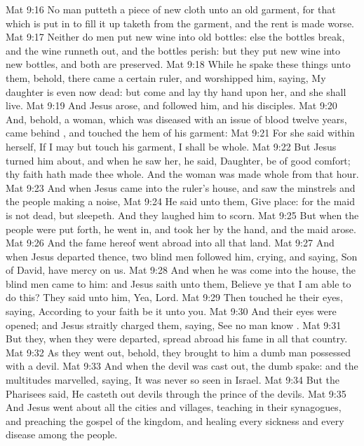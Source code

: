 \vs Mat 9:16 No man putteth a piece of new cloth unto an old garment, for that which is put in to fill it up taketh from the garment, and the rent is made worse.
\vs Mat 9:17 Neither do men put new wine into old bottles: else the bottles break, and the wine runneth out, and the bottles perish: but they put new wine into new bottles, and both are preserved.
\vs Mat 9:18 While he spake these things unto them, behold, there came a certain ruler, and worshipped him, saying, My daughter is even now dead: but come and lay thy hand upon her, and she shall live.
\vs Mat 9:19 And Jesus arose, and followed him, and  his disciples.
\vs Mat 9:20 And, behold, a woman, which was diseased with an issue of blood twelve years, came behind , and touched the hem of his garment:
\vs Mat 9:21 For she said within herself, If I may but touch his garment, I shall be whole.
\vs Mat 9:22 But Jesus turned him about, and when he saw her, he said, Daughter, be of good comfort; thy faith hath made thee whole. And the woman was made whole from that hour.
\vs Mat 9:23 And when Jesus came into the ruler's house, and saw the minstrels and the people making a noise,
\vs Mat 9:24 He said unto them, Give place: for the maid is not dead, but sleepeth. And they laughed him to scorn.
\vs Mat 9:25 But when the people were put forth, he went in, and took her by the hand, and the maid arose.
\vs Mat 9:26 And the fame hereof went abroad into all that land.
\vs Mat 9:27 And when Jesus departed thence, two blind men followed him, crying, and saying,  Son of David, have mercy on us.
\vs Mat 9:28 And when he was come into the house, the blind men came to him: and Jesus saith unto them, Believe ye that I am able to do this? They said unto him, Yea, Lord.
\vs Mat 9:29 Then touched he their eyes, saying, According to your faith be it unto you.
\vs Mat 9:30 And their eyes were opened; and Jesus straitly charged them, saying, See  no man know .
\vs Mat 9:31 But they, when they were departed, spread abroad his fame in all that country.
\vs Mat 9:32 As they went out, behold, they brought to him a dumb man possessed with a devil.
\vs Mat 9:33 And when the devil was cast out, the dumb spake: and the multitudes marvelled, saying, It was never so seen in Israel.
\vs Mat 9:34 But the Pharisees said, He casteth out devils through the prince of the devils.
\vs Mat 9:35 And Jesus went about all the cities and villages, teaching in their synagogues, and preaching the gospel of the kingdom, and healing every sickness and every disease among the people.
